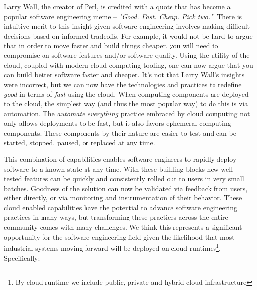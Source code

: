 \documentclass[conference]{IEEEconf}
\begin{document}
Larry Wall, the creator of Perl, is credited with a quote that has become a popular software engineering meme -- \textit{"Good. Fast. Cheap. Pick two."}.  There is intuitive merit to this insight given software engineering involves making difficult decisions based on informed tradeoffs.  For example, it would not be hard to argue that in order to move faster and build things cheaper, you will need to compromise on software features and/or software quality. Using the utility of the cloud, coupled with modern cloud computing tooling, one can now argue that you can build better software faster and cheaper.  It's not that Larry Wall's insights were incorrect, but we can now have the technologies and practices to redefine \textit{good} in terms of \textit{fast} using the cloud.  When computing components are deployed to the cloud, the simplest way (and thus the most popular way) to do this is via automation\cite{terraform, AWSCloudFormation, AzureLaunch, Pulumi}.  The \textit{automate everything} practice embraced by cloud computing not only allows deployments to be fast, but it also favors ephemeral computing components. These components by their nature are easier to test\cite{kim2016devops} and can be started, stopped, paused, or replaced at any time. 

This combination of capabilities enables software engineers to rapidly deploy software to a known state at any time. With these building blocks new well-tested features can be quickly and consistently rolled out to users in very small batches.  Goodness of the solution can now be validated via feedback from users, either directly, or via monitoring and instrumentation of their behavior.  These cloud enabled capabilities have the potential to advance software engineering practices in many ways, but transforming these practices across the entire community comes with many challenges. We think this represents a significant opportunity for the software engineering field given the likelihood that most industrial systems moving forward will be deployed on cloud runtimes\footnote{By cloud runtime we include public, private and hybrid cloud infrastructure}. Specifically:
\end{document}
